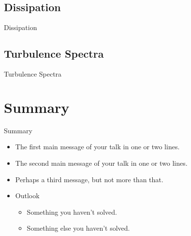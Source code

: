 \documentclass{beamer}
\begin{document}

\subsection{Dissipation}
\begin{frame}{Dissipation}

\end{frame}

\subsection{Turbulence Spectra}
\begin{frame}{Turbulence Spectra}

\end{frame}




\section*{Summary}

\begin{frame}{Summary}
  \begin{itemize}
  \item
    The \alert{first main message} of your talk in one or two lines.
  \item
    The \alert{second main message} of your talk in one or two lines.
  \item
    Perhaps a \alert{third message}, but not more than that.
  \end{itemize}
  
  \begin{itemize}
  \item
    Outlook
    \begin{itemize}
    \item
      Something you haven't solved.
    \item
      Something else you haven't solved.
    \end{itemize}
  \end{itemize}
\end{frame}



\appendix
\end{document}
